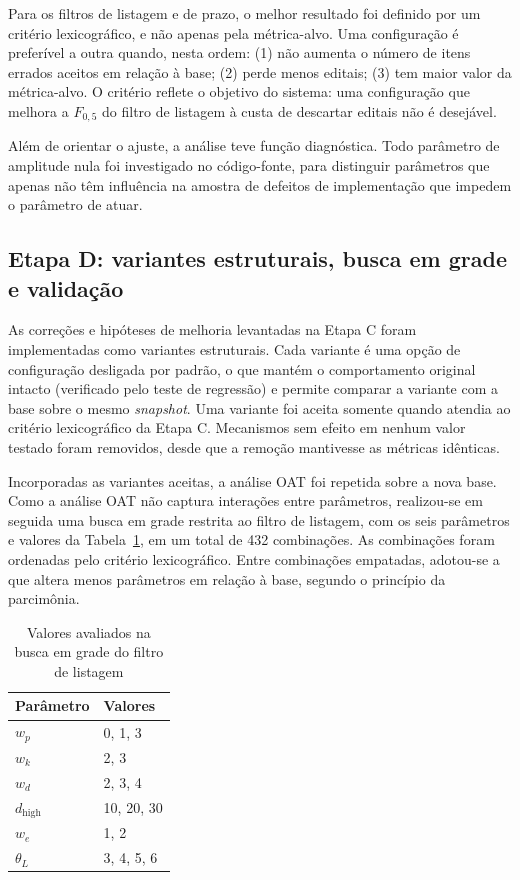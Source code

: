 Para os filtros de listagem e de prazo, o melhor resultado foi definido por um
critério lexicográfico, e não apenas pela métrica-alvo. Uma configuração é
preferível a outra quando, nesta ordem: (1) não aumenta o número de itens
errados aceitos em relação à base; (2) perde menos editais; (3) tem maior valor
da métrica-alvo. O critério reflete o objetivo do sistema: uma configuração que
melhora a $F_{0{,}5}$ do filtro de listagem à custa de descartar editais não é
desejável.

Além de orientar o ajuste, a análise teve função diagnóstica. Todo parâmetro de
amplitude nula foi investigado no código-fonte, para distinguir parâmetros que
apenas não têm influência na amostra de defeitos de implementação que impedem
o parâmetro de atuar.

\subsection{Etapa D: variantes estruturais, busca em grade e validação}
\label{subsec:etapaD}

As correções e hipóteses de melhoria levantadas na Etapa C foram implementadas
como variantes estruturais. Cada variante é uma opção de configuração desligada
por padrão, o que mantém o comportamento original intacto (verificado pelo
teste de regressão) e permite comparar a variante com a base sobre o mesmo
\textit{snapshot}. Uma variante foi aceita somente quando atendia ao critério
lexicográfico da Etapa C. Mecanismos sem efeito em nenhum valor testado foram
removidos, desde que a remoção mantivesse as métricas idênticas.

Incorporadas as variantes aceitas, a análise OAT foi repetida sobre a nova
base. Como a análise OAT não captura interações entre parâmetros, realizou-se
em seguida uma busca em grade restrita ao filtro de listagem, com os seis
parâmetros e valores da Tabela~\ref{tab:grade}, em um total de 432
combinações. As combinações foram ordenadas pelo critério lexicográfico. Entre
combinações empatadas, adotou-se a que altera menos parâmetros em relação à
base, segundo o princípio da parcimônia.

\begin{table}[htbp]
\centering
\caption{Valores avaliados na busca em grade do filtro de listagem}
\label{tab:grade}
\small
\begin{tabular}{l l}
\toprule
Parâmetro & Valores \\
\midrule
$w_p$               & 0, 1, 3 \\
$w_k$               & 2, 3 \\
$w_d$               & 2, 3, 4 \\
$d_{\mathrm{high}}$ & 10, 20, 30 \\
$w_e$               & 1, 2 \\
$\theta_L$          & 3, 4, 5, 6 \\
\bottomrule
\end{tabular}
\end{table}

